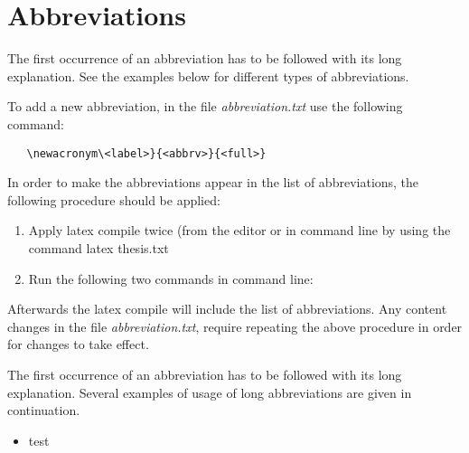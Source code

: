 \section{Abbreviations}
The first occurrence of an abbreviation has to be followed with its long explanation. See the examples below for different types of abbreviations.

To add a new abbreviation, in the file \emph{abbreviation.txt} use the following command:
\begin{verbatim} 
   \newacronym\<label>}{<abbrv>}{<full>}
\end{verbatim}

In order to make the abbreviations appear in the list of abbreviations, the following procedure should be applied:
\begin{enumerate}
	\item {Apply latex compile twice (from the editor or in command line by using the command latex thesis.txt}
	\item{Run the following two commands in command line:}
\end{enumerate}

Afterwards the latex compile will include the list of abbreviations. Any content changes in the file \emph{abbreviation.txt}, require repeating the above procedure in order for changes to take effect.

The first occurrence of an abbreviation has to be followed with its long explanation. Several examples of usage of long abbreviations are given in continuation.

\begin{itemize}
	\item test
\end{itemize}


